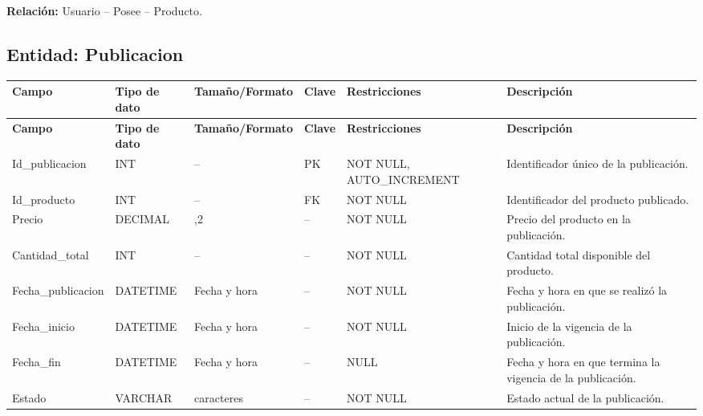 \documentclass[12pt]{article} %
\begin{document}
\textbf{Relación:}
Usuario -- Posee -- Producto.



\subsection{Entidad: Publicacion}

\begin{longtable}{>{\raggedright\arraybackslash}p{2.5cm}
                  >{\raggedright\arraybackslash}p{2.0cm}
                  >{\raggedright\arraybackslash}p{2.2cm}
                  >{\raggedright\arraybackslash}p{1.2cm}
                  >{\raggedright\arraybackslash}p{3.0cm}
                  >{\raggedright\arraybackslash}p{4.0cm}}
\toprule
\textbf{Campo} &
\textbf{Tipo de dato} &
\textbf{Tamaño/Formato} &
\textbf{Clave} &
\textbf{Restricciones} &
\textbf{Descripción} \\
\midrule
\endfirsthead

\toprule
\textbf{Campo} &
\textbf{Tipo de dato} &
\textbf{Tamaño/Formato} &
\textbf{Clave} &
\textbf{Restricciones} &
\textbf{Descripción} \\
\midrule
\endhead

Id\_publicacion &
INT &
-- &
PK &
NOT NULL, AUTO\_INCREMENT &
Identificador único de la publicación. \\

Id\_producto &
INT &
-- &
FK &
NOT NULL &
Identificador del producto publicado. \\

Precio &
DECIMAL &
10,2 &
-- &
NOT NULL &
Precio del producto en la publicación. \\

Cantidad\_total &
INT &
-- &
-- &
NOT NULL &
Cantidad total disponible del producto. \\

Fecha\_publicacion &
DATETIME &
Fecha y hora &
-- &
NOT NULL &
Fecha y hora en que se realizó la publicación. \\

Fecha\_inicio &
DATETIME &
Fecha y hora &
-- &
NOT NULL &
Inicio de la vigencia de la publicación. \\

Fecha\_fin &
DATETIME &
Fecha y hora &
-- &
NULL &
Fecha y hora en que termina la vigencia de la publicación. \\

Estado &
VARCHAR &
20 caracteres &
-- &
NOT NULL &
Estado actual de la publicación. \\

\bottomrule
\end{longtable}
\end{document}
